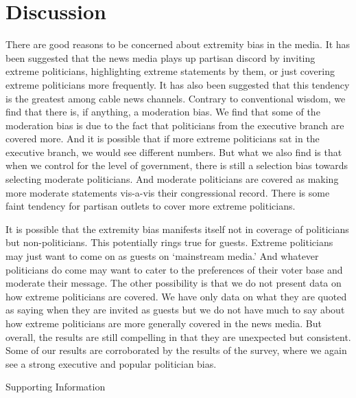 \documentclass[12pt, letterpaper]{article}
\begin{document}
\section*{Discussion}
There are good reasons to be concerned about extremity bias in the media. It has been suggested that the news media plays up partisan discord by inviting extreme politicians, highlighting extreme statements by them, or just covering extreme politicians more frequently. It has also been suggested that this tendency is the greatest among cable news channels. Contrary to conventional wisdom, we find that there is, if anything, a moderation bias. We find that some of the moderation bias is due to the fact that politicians from the executive branch are covered more. And it is possible that if more extreme politicians sat in the executive branch, we would see different numbers. But what we also find is that when we control for the level of government, there is still a selection bias towards selecting moderate politicians. And moderate politicians are covered as making more moderate statements vis-a-vis their congressional record. There is some faint tendency for partisan outlets to cover more extreme politicians.

It is possible that the extremity bias manifests itself not in coverage of politicians but non-politicians. This potentially rings true for guests. Extreme politicians may just want to come on as guests on `mainstream media.' And whatever politicians do come may want to cater to the preferences of their voter base and moderate their message. The other possibility is that we do not present data on how extreme politicians are covered. We have only data on what they are quoted as saying when they are invited as guests but we do not have much to say about how extreme politicians are more generally covered in the news media. But overall, the results are still compelling in that they are unexpected but consistent. Some of our results are corroborated by the results of the survey, where we again see a strong executive and popular politician bias.

\clearpage



\clearpage

\clearpage
\appendix
\renewcommand{\thesection}{SI \arabic{section}}
\setcounter{table}{0}\renewcommand\thetable{\thesection.\arabic{table}}
\setcounter{figure}{0}\renewcommand\thefigure{\thesection.\arabic{figure}}

\begin{center}
\Large{Supporting Information}
\end{center}
\end{document}
